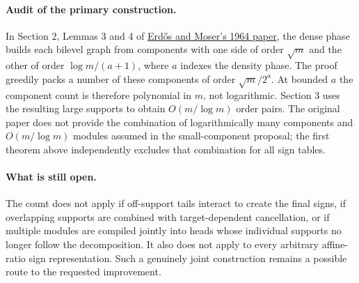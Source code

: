 \documentclass[11pt]{article}
\begin{document}
\paragraph{Audit of the primary construction.}
In Section 2, Lemmas 3 and 4 of
\href{https://www.renyi.hu/~p_erdos/1964-22.pdf}{Erd\H{o}s and Moser's
1964 paper}, the dense phase builds each bilevel graph from components
with one side of order $\sqrt m$ and the other of order
$\log m/(a+1)$, where $a$ indexes the density phase. The proof greedily
packs a number of these components of order $\sqrt m/2^a$.
At bounded $a$ the component count is therefore polynomial in $m$,
not logarithmic. Section 3 uses the resulting large supports to obtain
$O(m/\log m)$ order pairs. The original paper does not provide the
combination of logarithmically many components and $O(m/\log m)$
modules assumed in the small-component proposal; the first theorem
above independently excludes that combination for all sign tables.

\paragraph{What is still open.}
The count does not apply if off-support tails interact to create the
final signs, if overlapping supports are combined with target-dependent
cancellation, or if multiple modules are compiled jointly into heads
whose individual supports no longer follow the decomposition. It also
does not apply to every arbitrary affine-ratio sign representation.
Such a genuinely joint construction remains a possible route to the
requested improvement.
\end{document}
